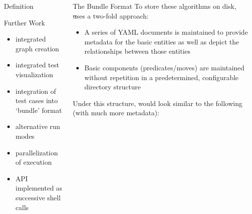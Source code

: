 \documentclass{beamer}
\begin{document}
\begin{frame}[fragile,t]
\begin{columns}[t]
\begin{column}{.45\textwidth}
\begin{block}{Definition}
\begin{center}
        \end{center}
        \vspace{-.03in}
      \end{block}
      \begin{block}{Further Work}
        \begin{multicols}{2}
          \begin{itemize}
          \item integrated graph creation
          \item integrated test visualization
          \item integration of test cases into `bundle' format
          \item alternative run modes
          \item parallelization of execution
          \item API implemented as successive shell calls
          \end{itemize}
        \end{multicols}%
        \vspace*{-.04in}%
      \end{block}
    \end{column}
    \begin{column}{.45\textwidth}
      \begin{block}{The Bundle Format}
        To store these algorithms on disk, \st uses a two-fold approach:
        \begin{itemize}
        \item A series of YAML documents is maintained to provide
          metadata for the basic entities as well as depict the
          relationships between those entities
        \item Basic components (predicates\slash moves) are maintained
          without repetition in a predetermined, configurable
          directory structure
        \end{itemize}
        Under this structure, \IndSet would look similar to the following
          (with much more metadata):

        \vspace{-.14in}


\end{block}
\end{column}
\end{columns}
\end{frame}
\end{document}
